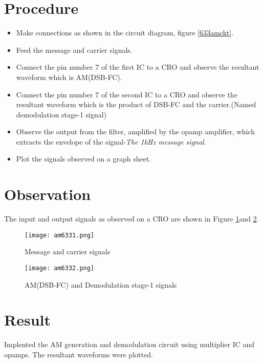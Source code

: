 \section*{Procedure}
\begin{itemize}
\item
Make connections as shown in the circuit diagram, figure \ref{633amckt}.
\item
Feed the message and carrier signals.
\item
Connect the pin number 7 of the first IC to a CRO and observe the resultant waveform which is AM(DSB-FC).
\item
Connect the pin number 7 of the second IC to a CRO and observe the resultant waveform which is the product of DSB-FC and the carrier.(Named demodulation stage-1 signal)
\item
Observe the output from the filter, amplified by the opamp amplifier, which extracts the envelope of the signal-\emph{The 1kHz message signal}.
\item
Plot the signals observed on a graph sheet.
\end{itemize}
\section*{Observation}
The input and output signals as observed on a CRO are shown in Figure \ref{AM633plot1}and \ref{AM633plot2}.
\begin{figure}[ht]
\texttt{[image: am6331.png]}
\caption{Message and carrier signals}
\label{AM633plot1}
\end{figure}

\begin{figure}[ht]
\texttt{[image: am6332.png]}
\caption{AM(DSB-FC) and Demodulation stage-1 signals}
\label{AM633plot2}
\end{figure}


\section*{Result}
Implented the AM generation and demodulation circuit using multiplier IC and opamps.
The resultant waveforms were plotted.